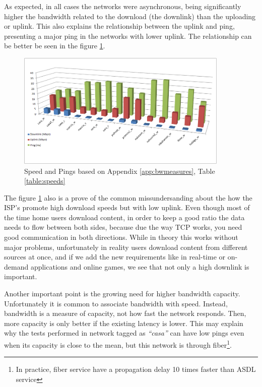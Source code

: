 As expected, in all cases the networks were asynchronous, being significantly
higher the bandwidth related to the download (the downlink) than the uploading
or uplink. This also explains the relationship between the uplink and ping,
presenting a major ping in the networks with lower uplink. The relationship
can be better be seen in the figure \ref{fig:speeds}.

\begin{figure}[ht]
\centering
    \includegraphics[width=0.9\textwidth]{img/speed_graph}
\caption{Speed and Pings based on Appendix \ref{app:bwmeasures}, Table \ref{table:speeds}}
\label{fig:speeds}
\end{figure}%

The figure \ref{fig:speeds} also is a prove of the common missundersanding
about the how the ISP's promote high download speeds but with low uplink. Even
though most of the time home users download content, in order to keep a good
ratio the data needs to flow between both sides, because due the way TCP
works, you need good communication in both directions. While in theory this
works without major problems, unfortunately in reality users download content
from different sources at once, and if we add the new requirements like in
real-time  or on-demand applications and online games, we see that not only a
high downlink is important.

Another important point is the growing need for higher bandwidth capacity.
Unfortunately it is common to associate bandwidth with speed. Instead,
bandwidth is a measure of capacity, not how fast the network responds. Then,
more capacity is only better if the existing latency is lower. This may
explain why the tests performed in network tagged as \textit{``casa''} can have low pings
even when its capacity is close to the mean, but this network is through
fiber\footnote{In practice, fiber service have a propagation delay 10 times
faster than ASDL service}.

